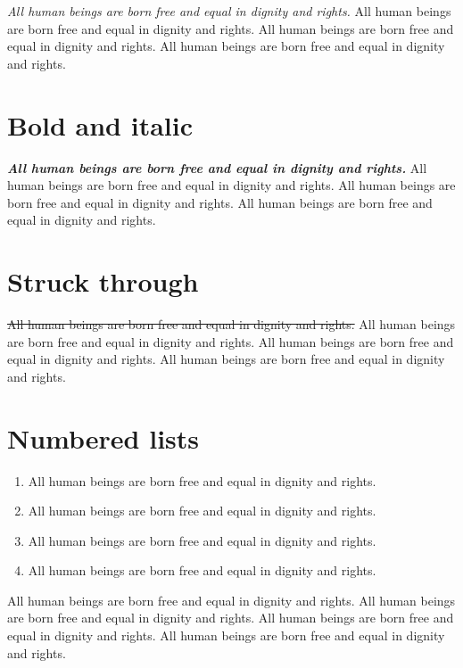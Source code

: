 \documentclass[
  titlepage,
  openright,
  DIV=calc,
  toc=listof,
  listof=nochaptergap]{scrbook}
\providecommand{\tightlist}{%
  \setlength{\itemsep}{0pt}\setlength{\parskip}{0pt}}
\begin{document}
\emph{All human beings are born free and equal in dignity and rights.}
All human beings are born free and equal in dignity and rights. All
human beings are born free and equal in dignity and rights. All human
beings are born free and equal in dignity and rights.

\hypertarget{bold-and-italic}{%
\section{Bold and italic}\label{bold-and-italic}}

\textbf{\emph{All human beings are born free and equal in dignity and
rights.}} All human beings are born free and equal in dignity and
rights. All human beings are born free and equal in dignity and rights.
All human beings are born free and equal in dignity and rights.

\hypertarget{struck-through}{%
\section{Struck through}\label{struck-through}}

\st{All human beings are born free and equal in dignity and rights.} All
human beings are born free and equal in dignity and rights. All human
beings are born free and equal in dignity and rights. All human beings
are born free and equal in dignity and rights.

\hypertarget{numbered-lists}{%
\section{Numbered lists}\label{numbered-lists}}

\begin{enumerate}
\def\labelenumi{\arabic{enumi}.}
\tightlist
\item
  All human beings are born free and equal in dignity and rights.
\item
  All human beings are born free and equal in dignity and rights.
\item
  All human beings are born free and equal in dignity and rights.
\item
  All human beings are born free and equal in dignity and rights.
\end{enumerate}

All human beings are born free and equal in dignity and rights. All
human beings are born free and equal in dignity and rights. All human
beings are born free and equal in dignity and rights. All human beings
are born free and equal in dignity and rights.
\end{document}
